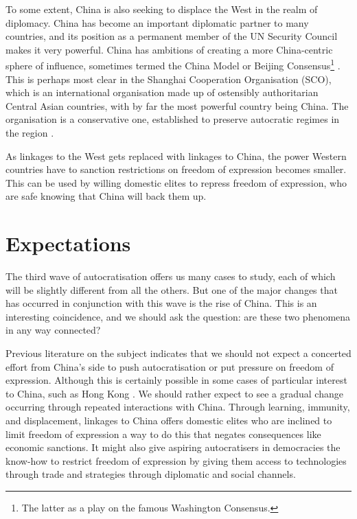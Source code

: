 To some extent, China is also seeking to displace the West in the realm of diplomacy. China has become an important diplomatic partner to many countries, and its position as a permanent member of the UN Security Council makes it very powerful. China has ambitions of creating a more China-centric sphere of influence, sometimes termed the China Model or Beijing Consensus\footnote{The latter as a play on the famous Washington Consensus.} \citep{ambrosio_rise_2012, economy_exporting_2020}. This is perhaps most clear in the Shanghai Cooperation Organisation (SCO), which is an international organisation made up of ostensibly authoritarian Central Asian countries, with by far the most powerful country being China. The organisation is a conservative one, established to preserve autocratic regimes in the region \citep[p. 1322]{ambrosio_catching_2008}.

As linkages to the West gets replaced with linkages to China, the power Western countries have to sanction restrictions on freedom of expression becomes smaller. This can be used by willing domestic elites to repress freedom of expression, who are safe knowing that China will back them up.

\section{Expectations} \label{sec:hypotheses}
The third wave of autocratisation offers us many cases to study, each of which will be slightly different from all the others. But one of the major changes that has occurred in conjunction with this wave is the rise of China. This is an interesting coincidence, and we should ask the question: are these two phenomena in any way connected?

Previous literature on the subject indicates that we should not expect a concerted effort from China's side to push autocratisation or put pressure on freedom of expression. Although this is certainly possible in some cases of particular interest to China, such as Hong Kong \citep{chen_democracy_2015}. We should rather expect to see a gradual change occurring through repeated interactions with China. Through learning, immunity, and displacement, linkages to China offers domestic elites who are inclined to limit freedom of expression a way to do this that negates consequences like economic sanctions. It might also give aspiring autocratisers in democracies the know-how to restrict freedom of expression by giving them access to technologies through trade and strategies through diplomatic and social channels. 

